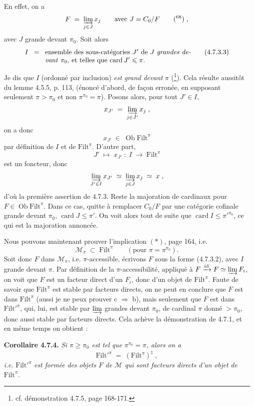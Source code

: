 \documentclass[11pt]{article}
\newcommand{\printedpage}[1]{\marginpar{\footnotesize p.~#1}}
\newcommand{\msp}[1]{\marginpar{\footnotesize [#1]}}
\newcommand{\Filt}{\mathrm{Filt}}
\newcommand{\card}{\operatorname{card}}
\newcommand{\Ob}{\operatorname{Ob}}
\begin{document}
En effet, on a
\[
F \;=\; \varinjlim_{j \in J} x_j \qquad \text{avec } J = C_0/F \qquad \text{(\footnotemark[68])}\;,
\]
avec $J$ grande devant $\pi_0$. Soit alors
\[
I \;\;=\;\; \parbox[t]{0.62\textwidth}{ensemble des sous-catégories $J'$ de $J$ \textit{grandes devant} $\pi_0$, et telles que $\card J' \leqslant \pi$.} \tag*{(4.7.3.3)}
\]

\printedpage{55}

Je dis que $I$ (ordonné par inclusion) \textit{est grand devant} $\pi$ (\footnote[69]{cf. démonstration 4.7.5, page 168-171.}). Cela résulte aussitôt du lemme 4.5.5, p. 113, (énoncé d’abord, de façon erronée, en supposant seulement $\pi > \pi_0$ et non $\pi^{\pi_0} = \pi$). Posons alors, pour tout $J' \in I$,
\[
x_{J'} \;=\; \varinjlim_{j \in J'} x_j \;,
\]
on a donc
\[
x_{J'} \;\in\; \Ob \Filt^{\pi}
\]
par définition de $I$ et de $\Filt^{\pi}$. D’autre part,
\[
J' \;\longmapsto\; x_{J'} \;:\; I \;\longrightarrow\; \Filt^{\pi}
\]
\msp{page 166}
est un foncteur, donc
\[
\varinjlim_{J' \in I} x_{J'} \;\simeq\; \varinjlim_{j \in J} x_j \;\simeq\; x \;, %
\]
d’où la première assertion de 4.7.3. Reste la majoration de cardinaux pour $F \in \Ob \Filt^{\pi}$. Dans ce cas, quitte à remplacer $C_0/F$ par une catégorie cofinale grande devant $\pi_0$, $\card J \leqslant \pi'$. On voit alors tout de suite que $\card I \leqslant \pi'^{\pi_0}$, ce qui est la majoration annoncée.

Nous pouvons maintenant prouver l’implication $(*)$, page 164, i.e.
\[
\mathcal{M}_{\pi} \;\subset\; \Filt^{\pi} \qquad (\text{pour } \pi = \pi^{\pi_0}).
\]
Soit donc $F$ dans $\mathcal{M}_{\pi}$, i.e. $\pi$-accessible, écrivons $F$ sous la forme (4.7.3.2), avec $I$ grande devant $\pi$. Par définition de la $\pi$-accessibilité, appliqué à $F \xrightarrow{\mathrm{id}} F \simeq \varinjlim F_i$, on voit que $F$ est un facteur direct d’un $F_i$, donc d’un objet de $\Filt^{\pi}$. Faute de savoir que $\Filt^{\pi}$ est stable par facteurs directs, on ne peut en conclure que $F$ est dans $\Filt^{\pi}$ (aussi je ne peux prouver c $\Longrightarrow$ b), mais seulement que $F$ est dans $\Filt'^{\pi}$, qui, lui, est stable par $\varinjlim$ grandes devant $\pi_0$, de cardinal $\pi$ donné $> \pi_0$, donc aussi \msp{page 167} stable par facteurs directs. Cela achève la démonstration de 4.7.1, et en même temps on obtient :

\textbf{Corollaire 4.7.4.} \textit{Si $\pi \geqslant \pi_0$ est tel que $\pi^{\pi_0} = \pi$, alors on a}
\[
\Filt'^{\pi} \;=\; (\Filt^{\pi})^{\natural} \;, \tag*{(4.7.4.1)}
\]
\textit{i.e.} $\Filt'^{\pi}$ \textit{est formée des objets $F$ de $\mathcal{M}$ qui sont facteurs directs d’un objet de} $\Filt^{\pi}$.
\end{document}
